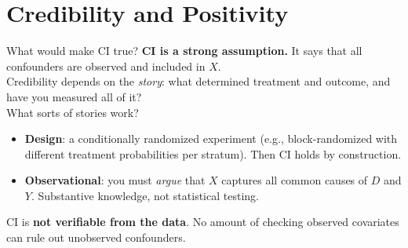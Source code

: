 \documentclass[xcolor=dvipsnames]{beamer}
\begin{document}



\section{Credibility and Positivity}

\begin{frame}{What would make CI true?}
\small
{} \textbf{CI is a strong assumption.}  It says that all confounders are observed and included in $X$.\\[6pt]

 Credibility depends on the \textit{story}: what determined treatment and outcome, and have you measured all of it?\\[4pt]

 What sorts of stories work?
\begin{itemize}
  \item<3-> \textbf{Design}: a conditionally randomized experiment (e.g., block-randomized with different treatment probabilities per stratum). Then CI holds by construction.\\[2pt]
  \item<3-> \textbf{Observational}: you must \textit{argue} that $X$ captures all common causes of $D$ and $Y$.  Substantive knowledge, not statistical testing.
\end{itemize}

\bigskip
{} CI is \textbf{not verifiable from the data}.  No amount of checking observed covariates can rule out unobserved confounders.
\end{frame}
\end{document}

